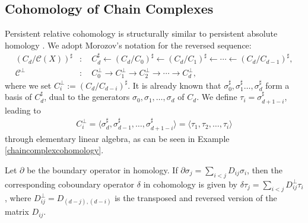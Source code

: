 \subsection{Cohomology of Chain Complexes}
Persistent relative cohomology is structurally similar to persistent absolute homology \cite[\S 2.7]{de2011dualities}. We adopt Morozov's notation for the reversed sequence:
\begin{align}
	(C_d / \mathcal{C}(X))^\sharp &: \quad C_d^\sharp \leftarrow (C_d / C_0)^\sharp \leftarrow (C_d / C_1)^\sharp \leftarrow \cdots \leftarrow (C_d / C_{d-1})^\sharp, \\
	\mathcal{C}^\perp &: \quad C_0^\perp \rightarrow C_1^\perp \rightarrow C_2^\perp \rightarrow \cdots \rightarrow C_d^\perp,
\end{align}
where we set \( C_i^\perp := (C_d / C_{d-i})^\sharp \). It is already known that \( \sigma_0^\sharp, \sigma_1^\sharp \ldots, \sigma_d^\sharp \) form a basis of \( C_d^\sharp \), dual to the generators \( \sigma_0, \sigma_1, \ldots, \sigma_d \) of \( C_d \). We define \( \tau_i = \sigma^\sharp_{d+1-i} \), leading to
\begin{align}
	C_i^\perp = \langle \sigma_d^\sharp, \sigma_{d-1}^\sharp, \ldots, \sigma_{d+1-i}^\sharp \rangle = \langle \tau_1, \tau_2, \ldots, \tau_i \rangle
\end{align}
through elementary linear algebra, as can be seen in Example \ref{chaincomplexcohomology}.

\begin{proposition}
Let \( \partial \) be the boundary operator in homology. If \( \partial \sigma_j = \sum_{i < j} D_{ij} \sigma_i \), then the corresponding coboundary operator \( \delta \) in cohomology is given by $\delta \tau_j = \sum_{i < j} D_{ij}^\perp \tau_i$, where \( D_{ij}^\perp = D_{(d-j),(d-i)} \) is the transposed and reversed version of the matrix \( D_{ij} \). 
\end{proposition}

